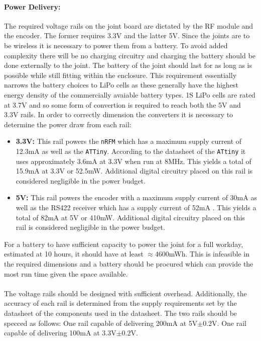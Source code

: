 \paragraph{Power Delivery:} %
\label{par:power_delivery}
The required voltage rails on the joint board are dictated by the RF module and the encoder.
The former requires 3.3V and the latter 5V.
Since the joints are to be wireless it is necessary to power them from a battery.
To avoid added complexity there will be no charging circuitry and charging the battery should be done externally to the joint.
The battery of the joint should last for as long as is possible while still fitting within the enclosure.
This requirement essentially narrows the battery choices to LiPo cells as these generally have the highest energy density of the commercially avaiable battery types.
1S LiPo cells are rated at 3.7V and so some form of convertion is required to reach both the 5V and 3.3V rails.
In order to correctly dimension the converters it is necessary to determine the power draw from each rail:
\begin{itemize}
 	\item \textbf{3.3V:} This rail powers the \texttt{nRFM} which has a maximum supply current of 12.3mA \cite{nRFM} as well as the \texttt{ATTiny}.
 	According to the datasheet of the \texttt{ATtiny} it uses approximately 3.6mA at 3.3V when run at 8MHz.   
 	This yields a total of 15.9mA at 3.3V or 52.5mW.
 	Additional digital circuitry placed on this rail is considered negligible in the power budget.
 	\item \textbf{5V:} This rail powers the encoder with a maximum supply current of 30mA \cite{RLC2IC} as well as the RS422 receiver which has a supply current of 52mA \cite{rs422rec}.
 	This yields a total of 82mA at 5V or 410mW.
 	Additional digital circuitry placed on this rail is considered negligible in the power budget.
\end{itemize}
For a battery to have sufficient capacity to power the joint for a full workday, estimated at 10 hours, it should have at least $\approx4600$mWh.
This is infeasible in the required dimensions and a battery should be procured which can provide the most run time given the space available.
\\~\\
The voltage rails should be designed with sufficient overhead.
Additionally, the accuracy of each rail is determined from the supply requirements set by the datasheet of the components used in the datasheet.
The two rails should be specced as follows:
One rail capable of delivering 200mA at 5V$\pm$0.2V.
One rail capable of delivering 100mA at 3.3V$\pm$0.2V.

